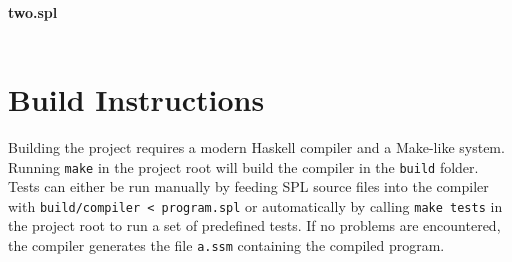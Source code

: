 \documentclass[a4paper]{article}
\begin{document}
\paragraph{two.spl}
\begin{verbatim}\end{verbatim}


\section{Build Instructions}

Building the project requires a modern Haskell compiler and a Make-like system.
Running \verb|make| in the project root will build the compiler in the \verb|build| folder.
Tests can either be run manually by feeding SPL source files into the compiler with \verb|build/compiler < program.spl| or automatically by calling \verb|make tests| in the project root to run a set of predefined tests.
If no problems are encountered, the compiler generates the file \verb|a.ssm| containing the compiled program.
\end{document}
